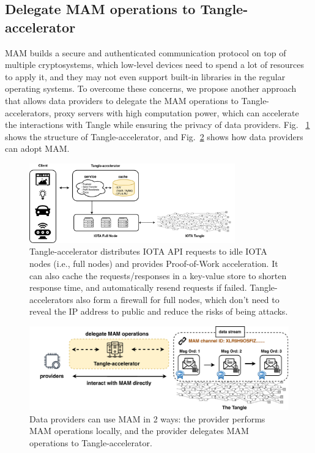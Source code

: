 \documentclass[conference]{IEEEtran}
\begin{document}
\subsection{Delegate MAM operations to Tangle-accelerator}
\label{section:ta_endpoint}
MAM builds a secure and authenticated communication protocol on top of multiple cryptosystems, which low-level devices need to spend a lot of resources to apply it, and they may not even support built-in libraries in the regular operating systems. To overcome these concerns, we propose another approach that allows data providers to delegate the MAM operations to Tangle-accelerators, proxy servers with high computation power, which can accelerate the interactions with Tangle while ensuring the privacy of data providers. Fig.~ \ref{fig:ta_struct} shows the structure of Tangle-accelerator, and Fig.~\ref{fig:delegation} shows how data providers can adopt MAM.

\begin{figure}[!t]
    \centering
    \includegraphics[width=3.5in]{ta_structure}
    \caption{Tangle-accelerator distributes IOTA API requests to idle IOTA nodes (i.e., full nodes) and provides Proof-of-Work acceleration. It can also cache the requests/responses in a key-value store to shorten response time, and automatically resend requests if failed. Tangle-accelerators also form a firewall for full nodes, which don't need to reveal the IP address to public and reduce the risks of being attacks.}
    \label{fig:ta_struct}
\end{figure}

\begin{figure}[!t]
    \centering
    \includegraphics[width=\linewidth]{delegation}
    \caption{Data providers can use MAM in 2 ways: the provider performs MAM operations locally, and the provider delegates MAM operations to Tangle-accelerator.}
    \label{fig:delegation}
\end{figure}
\end{document}
